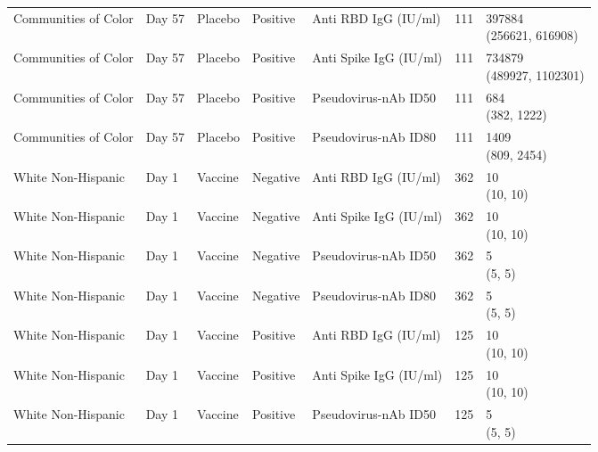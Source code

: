 \documentclass[]{book}
\theoremstyle{definition}
\theoremstyle{definition}
\theoremstyle{definition}
\newcommand{\1}{\mathbbm{1}}
\begin{document}
\begin{landscape}
\begin{ThreePartTable}
\begin{longtable}[t]{>{\raggedright\arraybackslash}p{7cm}llllll}
\hspace{1em}Communities of Color & Day 57 & Placebo & Positive & Anti RBD IgG (IU/ml) & 111 & \makecell[l]{397884\\(256621, 616908)}\\
\hspace{1em}Communities of Color & Day 57 & Placebo & Positive & Anti Spike IgG (IU/ml) & 111 & \makecell[l]{734879\\(489927, 1102301)}\\
\hspace{1em}Communities of Color & Day 57 & Placebo & Positive & Pseudovirus-nAb ID50 & 111 & \makecell[l]{684\\(382, 1222)}\\
\hspace{1em}Communities of Color & Day 57 & Placebo & Positive & Pseudovirus-nAb ID80 & 111 & \makecell[l]{1409\\(809, 2454)}\\
\hspace{1em}White Non-Hispanic & Day 1 & Vaccine & Negative & Anti RBD IgG (IU/ml) & 362 & \makecell[l]{10\\(10, 10)}\\
\hspace{1em}White Non-Hispanic & Day 1 & Vaccine & Negative & Anti Spike IgG (IU/ml) & 362 & \makecell[l]{10\\(10, 10)}\\
\hspace{1em}White Non-Hispanic & Day 1 & Vaccine & Negative & Pseudovirus-nAb ID50 & 362 & \makecell[l]{5\\(5, 5)}\\
\hspace{1em}White Non-Hispanic & Day 1 & Vaccine & Negative & Pseudovirus-nAb ID80 & 362 & \makecell[l]{5\\(5, 5)}\\
\hspace{1em}White Non-Hispanic & Day 1 & Vaccine & Positive & Anti RBD IgG (IU/ml) & 125 & \makecell[l]{10\\(10, 10)}\\
\hspace{1em}White Non-Hispanic & Day 1 & Vaccine & Positive & Anti Spike IgG (IU/ml) & 125 & \makecell[l]{10\\(10, 10)}\\
\hspace{1em}White Non-Hispanic & Day 1 & Vaccine & Positive & Pseudovirus-nAb ID50 & 125 & \makecell[l]{5\\(5, 5)}\\

\end{longtable}
\end{ThreePartTable}
\end{landscape}
\end{document}

